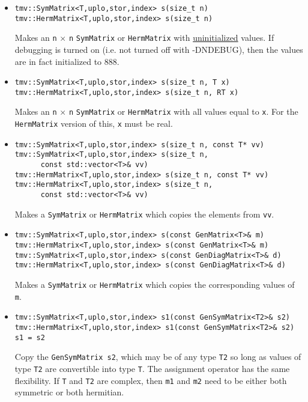 \documentclass[twoside,letterpaper,11pt]{article}
\renewcommand{\tt}[1]{{\texttt {#1}}}
\begin{document}
\begin{itemize}
\item 
\begin{verbatim}
tmv::SymMatrix<T,uplo,stor,index> s(size_t n)
tmv::HermMatrix<T,uplo,stor,index> s(size_t n)
\end{verbatim}
Makes an \tt{n} $\times$ \tt{n} \tt{SymMatrix} or \tt{HermMatrix}
with \underline{uninitialized} values.
If debugging is turned on (i.e. not turned off
with -DNDEBUG), then the values are in fact initialized to 888.  

\item
\begin{verbatim}
tmv::SymMatrix<T,uplo,stor,index> s(size_t n, T x)
tmv::HermMatrix<T,uplo,stor,index> s(size_t n, RT x)
\end{verbatim}
Makes an \tt{n} $\times$ \tt{n} \tt{SymMatrix} or \tt{HermMatrix} 
with all values equal to \tt{x}.
For the \tt{HermMatrix} version of this, \tt{x} must be real.

\item
\begin{verbatim}
tmv::SymMatrix<T,uplo,stor,index> s(size_t n, const T* vv)
tmv::SymMatrix<T,uplo,stor,index> s(size_t n, 
      const std::vector<T>& vv)
tmv::HermMatrix<T,uplo,stor,index> s(size_t n, const T* vv)
tmv::HermMatrix<T,uplo,stor,index> s(size_t n, 
      const std::vector<T>& vv)
\end{verbatim}
Makes a \tt{SymMatrix} or \tt{HermMatrix} which copies the elements from \tt{vv}.

\item 
\begin{verbatim}
tmv::SymMatrix<T,uplo,stor,index> s(const GenMatrix<T>& m)
tmv::HermMatrix<T,uplo,stor,index> s(const GenMatrix<T>& m)
tmv::SymMatrix<T,uplo,stor,index> s(const GenDiagMatrix<T>& d)
tmv::HermMatrix<T,uplo,stor,index> s(const GenDiagMatrix<T>& d)
\end{verbatim}
Makes a \tt{SymMatrix} or \tt{HermMatrix} which copies the corresponding values of \tt{m}.

\item
\begin{verbatim}
tmv::SymMatrix<T,uplo,stor,index> s1(const GenSymMatrix<T2>& s2)
tmv::HermMatrix<T,uplo,stor,index> s1(const GenSymMatrix<T2>& s2)
s1 = s2
\end{verbatim}
Copy the \tt{GenSymMatrix s2}, which may be of any type \tt{T2} so long
as values of type \tt{T2} are convertible into type \tt{T}.
The assignment operator has the same flexibility.
If \tt{T} and \tt{T2} are complex, then \tt{m1} and \tt{m2} need to be
either both symmetric or both hermitian.


\end{itemize}
\end{document}
